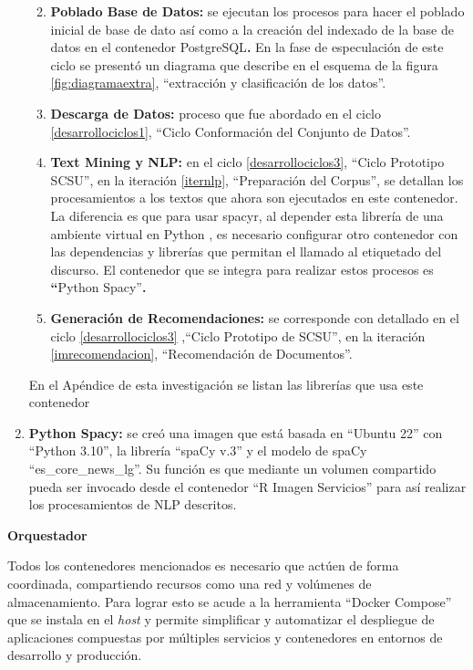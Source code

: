 \documentclass[
  12pt,
  openany]{book}
\providecommand{\tightlist}{%
  \setlength{\itemsep}{0pt}\setlength{\parskip}{0pt}}
\begin{document}
\begin{enumerate}
  \begin{enumerate}
  \def\labelenumii{\roman{enumii}.}
  \tightlist
  \item
    \textbf{Poblado Base de Datos:} se ejecutan los procesos para hacer el poblado inicial de base de dato así como a la creación del indexado de la base de datos en el contenedor PostgreSQL\textbf{.} En la fase de especulación de este ciclo se presentó un diagrama que describe en el esquema de la figura \ref{fig:diagramaextra}, ``extracción y clasificación de los datos''.
  \item
    \textbf{Descarga de Datos:} proceso que fue abordado en el ciclo \ref{desarrollociclos1}, ``Ciclo Conformación del Conjunto de Datos''.
  \item
    \textbf{Text Mining y NLP:} en el ciclo \ref{desarrollociclos3}, ``Ciclo Prototipo SCSU'', en la iteración \ref{iternlp}, ``Preparación del Corpus'', se detallan los procesamientos a los textos que ahora son ejecutados en este contenedor. La diferencia es que para usar spacyr, al depender esta librería de una ambiente virtual en Python , es necesario configurar otro contenedor con las dependencias y librerías que permitan el llamado al etiquetado del discurso. El contenedor que se integra para realizar estos procesos es \textbf{``}Python Spacy''\textbf{.}
  \item
    \textbf{Generación de Recomendaciones:} se corresponde con detallado en el ciclo \ref{desarrollociclos3} ,``Ciclo Prototipo de SCSU'', en la iteración \ref{imrecomendacion}, ``Recomendación de Documentos''.
  \end{enumerate}

  En el Apéndice de esta investigación se listan las librerías que usa este contenedor
\item
  \textbf{Python Spacy:} se creó una imagen que está basada en ``Ubuntu 22'' con ``Python 3.10'', la librería ``spaCy v.3'' y el modelo de spaCy ``es\_core\_news\_lg''. Su función es que mediante un volumen compartido pueda ser invocado desde el contenedor ``R Imagen Servicios'' para así realizar los procesamientos de NLP descritos.
\end{enumerate}

\textbf{Orquestador}

Todos los contenedores mencionados es necesario que actúen de forma coordinada, compartiendo recursos como una red y volúmenes de almacenamiento. Para lograr esto se acude a la herramienta ``Docker Compose'' que se instala en el \emph{host} y permite simplificar y automatizar el despliegue de aplicaciones compuestas por múltiples servicios y contenedores en entornos de desarrollo y producción.
\end{document}
